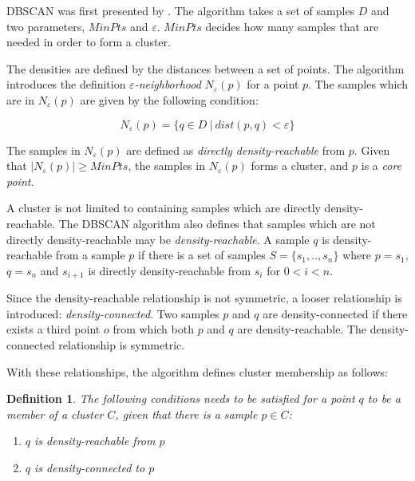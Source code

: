 \documentclass[a4paper]{report}
\newtheorem*{definition}{Definition}
\begin{document}
DBSCAN was first presented by \citet{ester96}. The algorithm takes a set of
samples $D$ and two parameters, $MinPts$ and $\varepsilon$. $MinPts$ decides
how many samples that are needed in order to form a cluster.

The densities are defined by the distances between a set of points.
The algorithm introduces the definition \emph{$\varepsilon$-neighborhood}
$N_{\varepsilon}(p)$ for a point $p$. The samples which are in 
$N_{\varepsilon}(p)$ are given by the following condition:

\begin{equation}
    N_{\varepsilon}(p) = \{ q \in D ~|~ dist(p,q) < \varepsilon  \}
    \label{eq:eps}
\end{equation}

The samples in $N_{\varepsilon}(p)$ are defined as
\emph{directly density-reachable} from $p$. Given that
$|N_{\varepsilon}(p)| \ge MinPts$, the samples in $N_{\varepsilon}(p)$ forms a
cluster, and $p$ is a \emph{core point}.

A cluster is not limited to containing samples which are directly
density-reachable. The DBSCAN algorithm also defines that samples which are
not directly density-reachable may be \emph{density-reachable}.
A sample $q$ is density-reachable from a sample $p$ if there is a set of samples
$S = \{s_1, .., s_n\}$ where $p = s_1$, $q = s_n$ and $s_{i+1}$ is directly
density-reachable from $s_i$ for $0 < i < n$.

Since the density-reachable relationship is not symmetric, a looser
relationship is introduced: \emph{density-connected}. Two samples $p$ and
$q$ are density-connected if there exists a third point $o$ from which both
$p$ and $q$ are density-reachable. The density-connected relationship
is symmetric.

With these relationships, the algorithm defines cluster membership as
follows:

\begin{definition}
    The following conditions needs to be satisfied for a point $q$ to be a
    member of a cluster $C$, given that there is a sample $p \in C$:
    \begin{enumerate}
        \item $q$ is density-reachable from $p$
        \item $q$ is density-connected to $p$
    \end{enumerate}
\end{definition}
\end{document}
